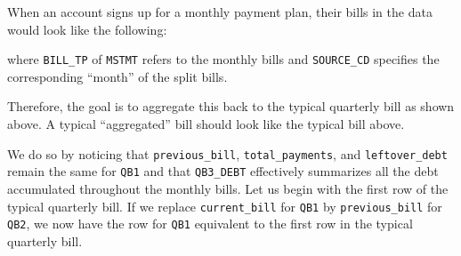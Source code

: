 \documentclass[11pt]{article}
\begin{document}
When an account signs up for a monthly payment plan, their bills in the data would look like the following:
\begin{table}[H]
\centering
\caption{Bill on Monthly Payment Plan}
\end{table}
where \texttt{BILL\_TP} of \texttt{MSTMT} refers to the monthly bills and \texttt{SOURCE\_CD} specifies the corresponding ``month'' of the split bills.

Therefore, the goal is to aggregate this back to the typical quarterly bill as shown above. A typical ``aggregated'' bill should look like the typical bill above.

We do so by noticing that \texttt{previous\_bill}, \texttt{total\_payments}, and \texttt{leftover\_debt} remain the same for \texttt{QB1} and that \texttt{QB3\_DEBT} effectively summarizes all the debt accumulated throughout the monthly bills. Let us begin with the first row of the typical quarterly bill. If we replace \texttt{current\_bill} for \texttt{QB1} by \texttt{previous\_bill} for \texttt{QB2}, we now have the row for \texttt{QB1} equivalent to the first row in the typical quarterly bill.
\end{document}
